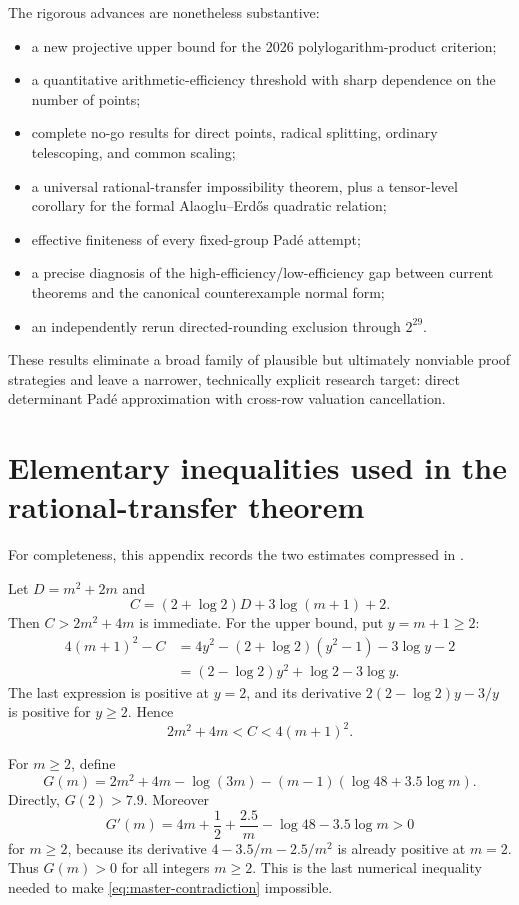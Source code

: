 \documentclass[11pt]{article}
\theoremstyle{definition}
\begin{document}
The rigorous advances are nonetheless substantive:

\begin{itemize}
\item a new projective upper bound for the 2026 polylogarithm-product criterion;
\item a quantitative arithmetic-efficiency threshold with sharp dependence on the number of
      points;
\item complete no-go results for direct points, radical splitting, ordinary telescoping, and
      common scaling;
\item a universal rational-transfer impossibility theorem, plus a tensor-level corollary for
      the formal Alaoglu--Erd\H{o}s quadratic relation;
\item effective finiteness of every fixed-group Pad\'e attempt;
\item a precise diagnosis of the high-efficiency/low-efficiency gap between current theorems
      and the canonical counterexample normal form;
\item an independently rerun directed-rounding exclusion through $2^{29}$.
\end{itemize}

These results eliminate a broad family of plausible but ultimately nonviable proof strategies
and leave a narrower, technically explicit research target: direct determinant Pad\'e
approximation with cross-row valuation cancellation.

\appendix

\section{Elementary inequalities used in the rational-transfer theorem}

For completeness, this appendix records the two estimates compressed in
.

Let $D=m^2+2m$ and
\[
 C=(2+\log2)D+3\log(m+1)+2.
\]
Then $C>2m^2+4m$ is immediate.  For the upper bound, put $y=m+1\ge2$:
\begin{align*}
 4(m+1)^2-C
 &=4y^2-(2+\log2)(y^2-1)-3\log y-2\\
 &=(2-\log2)y^2+\log2-3\log y.
\end{align*}
The last expression is positive at $y=2$, and its derivative
$2(2-\log2)y-3/y$ is positive for $y\ge2$.  Hence
\[
 2m^2+4m<C<4(m+1)^2.
\]

For $m\ge2$, define
\[
 G(m)=2m^2+4m-\log(3m)-(m-1)(\log48+3.5\log m).
\]
Directly, $G(2)>7.9$.  Moreover
\[
 G'(m)=4m+\frac12+\frac{2.5}{m}-\log48-3.5\log m>0
\]
for $m\ge2$, because its derivative
$4-3.5/m-2.5/m^2$ is already positive at $m=2$.  Thus $G(m)>0$ for all integers $m\ge2$.
This is the last numerical inequality needed to make
\eqref{eq:master-contradiction} impossible.
\end{document}
